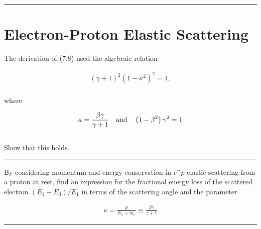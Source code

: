 
\noindent\rule{7in}{2.8pt}
\section{Electron-Proton Elastic Scattering}
    
\begin{problem}{7.1}
The derivation of (7.8) used the algebraic relation

\begin{align*}
    \left(\gamma+1\right)^2 \left(1-\kappa^2\right)^2 = 4,
\end{align*}\\
where 

\begin{align*}
    \kappa = \frac{\beta\gamma}{\gamma+1} \quad \text{and} \quad \left(1-\beta^2\right)\gamma^2 = 1
\end{align*}\\
Show that this holds.
\end{problem}
\begin{solution}

\end{solution}

\noindent\rule{7in}{1.5pt}


\begin{problem}{7.2}
    By considering momentum and energy conservation in $e^-p$ elastic scattering from a proton at rest, find an expression for the fractional energy loss of the scattered electron $\left( E_1 - E_3 \right)/E_1$ in terms of the scattering angle and the parameter

    \begin{align*}
        \kappa = \frac{p}{E_1 +m_e} \equiv \frac{\beta\gamma}{\gamma+1}
    \end{align*}
\end{problem}
\begin{solution}

\end{solution}

\noindent\rule{7in}{1.5pt}


